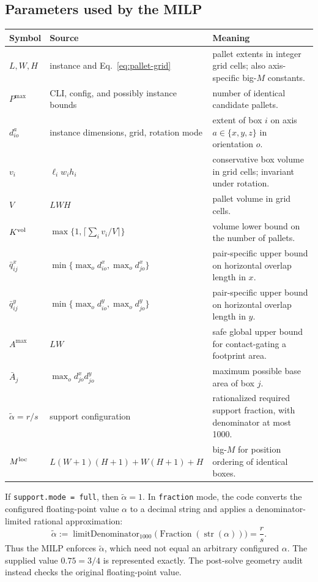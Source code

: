 \documentclass[11pt]{article}
\begin{document}
\subsection{Parameters used by the MILP}

\begin{longtable}{@{}p{2.4cm}p{3.2cm}p{8cm}@{}}
\toprule
Symbol & Source & Meaning \\
\midrule
\endhead
$L,W,H$ & instance and Eq.~\eqref{eq:pallet-grid} & pallet extents in integer grid cells; also axis-specific big-$M$ constants.\\
$P^{\max}$ & CLI, config, and possibly instance bounds & number of identical candidate pallets.\\
$d^a_{io}$ & instance dimensions, grid, rotation mode & extent of box $i$ on axis $a\in\{x,y,z\}$ in orientation $o$.\\
$v_i$ & $\ell_iw_ih_i$ & conservative box volume in grid cells; invariant under rotation.\\
$V$ & $LWH$ & pallet volume in grid cells.\\
$K^{\rm vol}$ & $\max\{1,\lceil\sum_i v_i/V\rceil\}$ & volume lower bound on the number of pallets.\\
$\bar q^x_{ij}$ & $\min\{\max_o d^x_{io},\max_o d^x_{jo}\}$ & pair-specific upper bound on horizontal overlap length in $x$.\\
$\bar q^y_{ij}$ & $\min\{\max_o d^y_{io},\max_o d^y_{jo}\}$ & pair-specific upper bound on horizontal overlap length in $y$.\\
$A^{\max}$ & $LW$ & safe global upper bound for contact-gating a footprint area.\\
$\bar A_j$ & $\max_o d^x_{jo}d^y_{jo}$ & maximum possible base area of box $j$.\\
$\widetilde\alpha=r/s$ & support configuration & rationalized required support fraction, with denominator at most 1000.\\
$M^{\rm loc}$ & $L(W+1)(H+1)+W(H+1)+H$ & big-$M$ for position ordering of identical boxes.\\
\bottomrule
\end{longtable}

If \texttt{support.mode = full}, then $\widetilde\alpha=1$.  In
\texttt{fraction} mode, the code converts the configured floating-point value
$\alpha$ to a decimal string and applies a denominator-limited rational
approximation:
\begin{equation}
 \widetilde\alpha:=
 \operatorname{limitDenominator}_{1000}
 \bigl(\operatorname{Fraction}(\operatorname{str}(\alpha))\bigr)
 =\frac rs.
 \label{eq:rational-alpha}
\end{equation}
Thus the MILP enforces $\widetilde\alpha$, which need not equal an arbitrary
configured $\alpha$.  The supplied value $0.75=3/4$ is represented exactly.
The post-solve geometry audit instead checks the original floating-point value.
\end{document}
